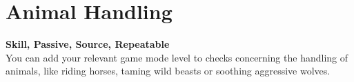 \section{Animal Handling}\label{sec:animalHandling}
\textbf{Skill, Passive, Source, Repeatable}\\
You can add your relevant game mode level to checks concerning the handling of animals, like riding horses, taming wild beasts or soothing aggressive wolves.